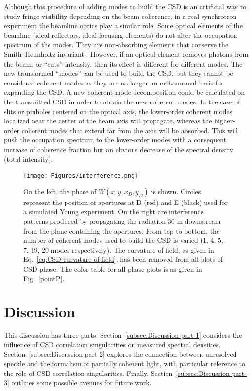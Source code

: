 \documentclass[%
 reprint,
 amsmath,amssymb,
 aps,
]{revtex4-1}
\begin{document}
Although this procedure of adding modes to build the CSD is an artificial way to study fringe visibility depending on the beam coherence, in a real synchrotron experiment the beamline optics play a similar role. Some optical elements of the beamline (ideal reflectors, ideal focusing elements) do not alter the occupation spectrum of the modes. They are non-absorbing elements that conserve the Smith--Helmholtz invariant \cite{BornWolf}. However, if an optical element removes photons from the beam, or ``cuts'' intensity, then its effect is different for different modes. The new transformed ``modes'' can be used to build the CSD, but they cannot be considered coherent modes as they are no longer an orthonormal basis for expanding the CSD. A new coherent mode decomposition could be calculated on the transmitted CSD in order to obtain the new coherent modes. In the case of slits or pinholes centered on the optical axis, the lower-order coherent modes localized near the center of the beam axis will propagate, whereas the higher-order coherent modes that extend far from the axis will be absorbed. This will push the occupation spectrum to the lower-order modes with a consequent increase of coherence fraction but an obvious decrease of the spectral density (total intensity).     

\begin{figure}
\texttt{[image: Figures/interference.png]}
\caption{On the left, the phase of $W(x,y,x_{D},y_{D})$ is shown. Circles represent the position of apertures at D (red) and E (black) used for a simulated Young experiment. On the right are interference patterns
produced by propagating the radiation 30 m downstream from the plane containing the apertures. From top to bottom, the number of coherent modes used to build the CSD is varied (1, 4, 5, 7, 19, 20 modes respectively). The curvature of field, as given in Eq.~\ref{eq:CSD-curvature-of-field}, has been removed from all plots of CSD phase. The color table for all phase plots is as given in Fig.~\ref{pointP}.}
\label{young}
\end{figure}

\section{Discussion}

This discussion has three parts.  Section~\ref{subsec:Discussion-part-1} considers the influence of CSD correlation singularities on measured spectral densities.  Section~\ref{subsec:Discussion-part-2} explores the connection between unresolved speckle and the formalism of partially coherent light, with particular reference to the role of CSD correlation singularities.  Finally, Section~\ref{subsec:Discussion-part-3} outlines some possible avenues for future work.  
\end{document}
